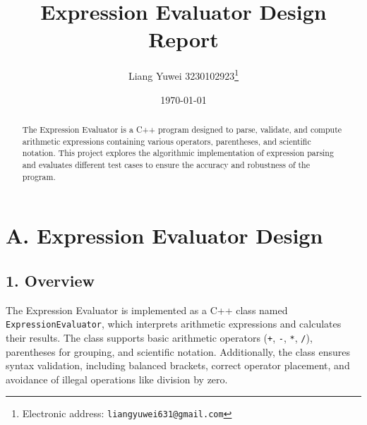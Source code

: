 \documentclass[a4paper]{article}
\title{Expression Evaluator Design Report}
\author{Liang Yuwei 3230102923\thanks{Electronic address: \texttt{liangyuwei631@gmail.com}}}
\affil{(Mathematics and Applied Mathematics 2302), Zhejiang University }
\date{\today}
\begin{document}
\maketitle

\begin{abstract}
The Expression Evaluator is a C++ program designed to parse, validate, and compute arithmetic expressions containing various operators, parentheses, and scientific notation. This project explores the algorithmic implementation of expression parsing and evaluates different test cases to ensure the accuracy and robustness of the program.
\end{abstract}

\section*{A. Expression Evaluator Design}

\subsection*{1. Overview}
The Expression Evaluator is implemented as a C++ class named \texttt{ExpressionEvaluator}, which interprets arithmetic expressions and calculates their results. The class supports basic arithmetic operators (\texttt{+}, \texttt{-}, \texttt{*}, \texttt{/}), parentheses for grouping, and scientific notation. Additionally, the class ensures syntax validation, including balanced brackets, correct operator placement, and avoidance of illegal operations like division by zero.
\end{document}
